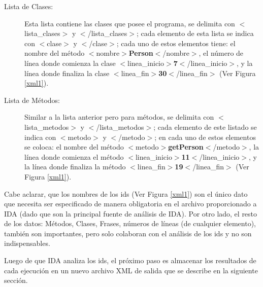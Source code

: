 \begin{appendices}
\begin{description}
\item[Lista de Clases:] Esta lista contiene las clases que posee el programa, se delimita con \mbox{$<$\textsf{lista\_clases}$>$} y \mbox{$<$/\textsf{lista\_clases}$>$}; cada elemento de esta lista se indica con $<$\textsf{clase}$>$ y $<$/\textsf{clase}$>$; cada uno de estos elementos tiene: el nombre del método  \mbox{$<$\textsf{nombre}$>$\textbf{Person}$<$/\textsf{nombre}$>$}, el número de línea donde comienza la clase \mbox{$<$\textsf{linea\_inicio}$>$\textbf{7}$<$/\textsf{linea\_inicio}$>$}, y la línea donde finaliza la clase \mbox{$<$\textsf{linea\_fin}$>$\textbf{30}$<$/\textsf{linea\_fin}$>$} (Ver Figura \ref{xml1}). 

\item[Lista de Métodos:] Similar a la lista anterior pero para métodos, se delimita con \mbox{$<$\textsf{lista\_metodos}$>$} y \mbox{$<$/\textsf{lista\_metodos}$>$}; cada elemento de este listado se indica con $<$\textsf{metodo}$>$ y $<$/\textsf{metodo}$>$; en cada uno de estos elementos se coloca: el nombre del método \mbox{$<$\textsf{metodo}$>$\textbf{getPerson}$<$/\textsf{metodo}$>$}, la línea donde comienza el método \mbox{$<$\textsf{linea\_inicio}$>$\textbf{11}$<$/\textsf{linea\_inicio}$>$}, y la línea donde finaliza la método \mbox{$<$\textsf{linea\_fin}$>$\textbf{19}$<$/\textsf{linea\_fin}$>$} (Ver Figura \ref{xml1}).

\end{description}

Cabe aclarar, que los nombres de los ids (Ver Figura \ref{xml1}) son el único dato que necesita ser especificado de manera obligatoria en el archivo proporcionado a IDA (dado que son la principal fuente de análisis de IDA). Por otro lado, el resto de los datos: Métodos, Clases, Frases, números de líneas (de cualquier elemento), también son importantes, pero solo colaboran con el análisis de los ids y no son indispensables.
 
Luego de que IDA analiza los ids, el próximo paso es almacenar los resultados de cada ejecución en un nuevo archivo XML de salida que se describe en la siguiente sección.





\end{appendices}
